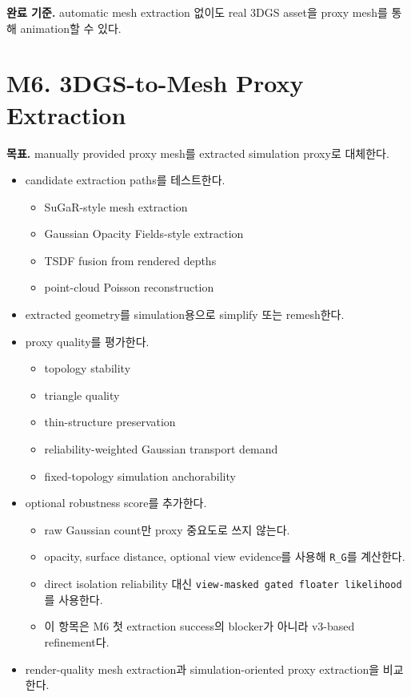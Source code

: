 \documentclass[10pt]{article}
\newcommand{\code}[1]{\texttt{#1}}
\begin{document}
\textbf{완료 기준.} automatic mesh extraction 없이도 real 3DGS asset을 proxy mesh를 통해 animation할 수 있다.

\section{M6. 3DGS-to-Mesh Proxy Extraction}

\textbf{목표.} manually provided proxy mesh를 extracted simulation proxy로 대체한다.

\begin{itemize}
  \item candidate extraction paths를 테스트한다.
    \begin{itemize}
      \item SuGaR-style mesh extraction
      \item Gaussian Opacity Fields-style extraction
      \item TSDF fusion from rendered depths
      \item point-cloud Poisson reconstruction
    \end{itemize}
  \item extracted geometry를 simulation용으로 simplify 또는 remesh한다.
  \item proxy quality를 평가한다.
    \begin{itemize}
      \item topology stability
      \item triangle quality
      \item thin-structure preservation
      \item reliability-weighted Gaussian transport demand
      \item fixed-topology simulation anchorability
    \end{itemize}
  \item optional robustness score를 추가한다.
    \begin{itemize}
      \item raw Gaussian count만 proxy 중요도로 쓰지 않는다.
      \item opacity, surface distance, optional view evidence를 사용해 \code{R\_G}를 계산한다.
      \item direct isolation reliability 대신 \code{view-masked gated floater likelihood}를 사용한다.
      \item 이 항목은 M6 첫 extraction success의 blocker가 아니라 v3-based refinement다.
    \end{itemize}
  \item render-quality mesh extraction과 simulation-oriented proxy extraction을 비교한다.
\end{itemize}
\end{document}
